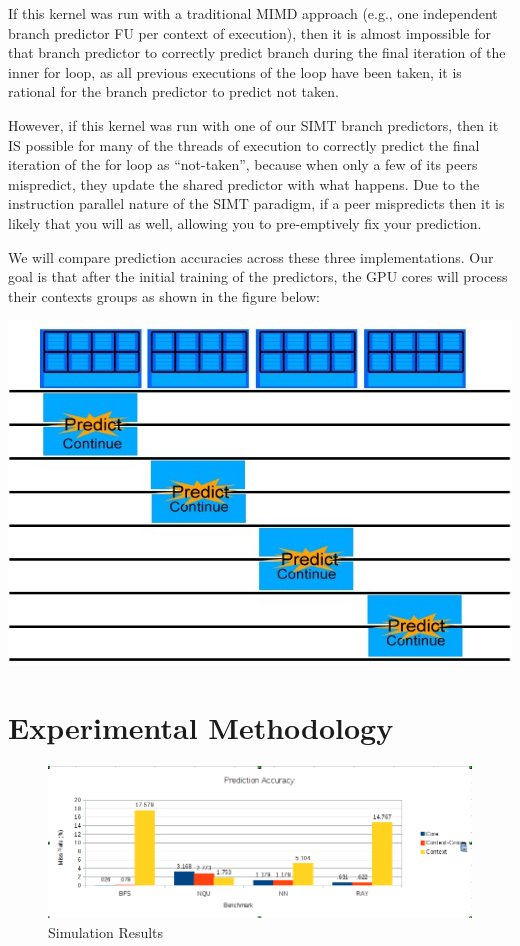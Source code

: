 \documentclass[conference]{IEEEtran}
\begin{document}
If this kernel was run with a traditional MIMD approach (e.g., one independent branch predictor FU per context of execution), then it is almost
impossible for that branch predictor to correctly predict branch during the final iteration of the inner for loop, as all previous executions of the loop
have been taken, it is rational for the branch predictor to predict not taken.

However, if this kernel was run with one of our SIMT branch predictors, then it IS possible for many of the threads of execution to correctly predict the final iteration
of the for loop as ``not-taken'', because when only a few of its peers mispredict, they update the shared predictor with what happens.  Due to the instruction parallel nature of the 
SIMT paradigm, if a peer mispredicts then it is likely that you will as well, allowing you to pre-emptively fix your prediction.

We will compare prediction accuracies across these three implementations.  Our goal is that after the initial training of the predictors, the GPU cores will process their contexts groups as shown in the figure below:

\begin{center}
	\includegraphics[width=.45\textwidth]{GPU-predict-context.jpg}
\end{center}

\section{Experimental Methodology}

\begin{figure}[t]
	\begin{center}
	\includegraphics[width=.8\textwidth]{data2.png}
	\end{center}
	\caption{Simulation Results}
	\label{results}
\end{figure}
\end{document}

